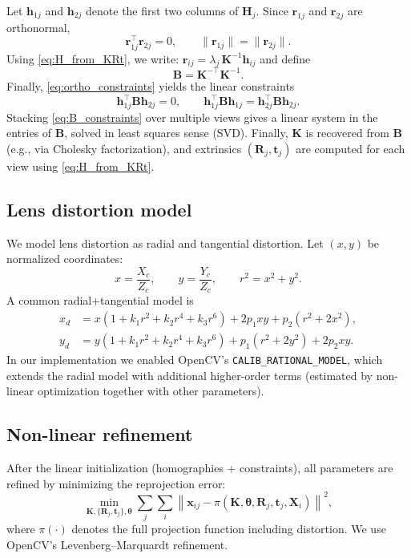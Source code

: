 \documentclass{article}
\begin{document}
Let $\mathbf{h}_{1j}$ and $\mathbf{h}_{2j}$ denote the first two columns of $\mathbf{H}_j$.
Since $\mathbf{r}_{1j}$ and $\mathbf{r}_{2j}$ are orthonormal,
\begin{equation}
\mathbf{r}_{1j}^{\top}\mathbf{r}_{2j}=0,
\qquad
\|\mathbf{r}_{1j}\|=\|\mathbf{r}_{2j}\|.
\label{eq:ortho_constraints}
\end{equation}
Using \eqref{eq:H_from_KRt}, we write:
$\mathbf{r}_{ij}=\lambda_j\,\mathbf{K}^{-1}\mathbf{h}_{ij}$ and define
\begin{equation}
\mathbf{B}=\mathbf{K}^{-\top}\mathbf{K}^{-1}.
\label{eq:B_def}
\end{equation}
Finally, \eqref{eq:ortho_constraints} yields the linear constraints
\begin{equation}
\mathbf{h}_{1j}^{\top}\mathbf{B}\mathbf{h}_{2j}=0,
\qquad
\mathbf{h}_{1j}^{\top}\mathbf{B}\mathbf{h}_{1j}=
\mathbf{h}_{2j}^{\top}\mathbf{B}\mathbf{h}_{2j}.
\label{eq:B_constraints}
\end{equation}
Stacking \eqref{eq:B_constraints} over multiple views gives a linear system in the entries of $\mathbf{B}$,
solved in least squares sense (SVD). Finally, $\mathbf{K}$ is recovered from $\mathbf{B}$ (e.g., via Cholesky factorization),
and extrinsics $(\mathbf{R}_j,\mathbf{t}_j)$ are computed for each view using \eqref{eq:H_from_KRt}.

\subsection{Lens distortion model}
We model lens distortion as radial and tangential distortion. Let $(x,y)$ be normalized coordinates:
\begin{equation}
x=\frac{X_c}{Z_c},\qquad y=\frac{Y_c}{Z_c},\qquad r^2=x^2+y^2.
\label{eq:normalized_coords}
\end{equation}
A common radial+tangential model is
\begin{align}
x_d &= x\left(1+k_1 r^2+k_2 r^4+k_3 r^6\right) + 2p_1xy + p_2(r^2+2x^2), \label{eq:dist_x}\\
y_d &= y\left(1+k_1 r^2+k_2 r^4+k_3 r^6\right) + p_1(r^2+2y^2) + 2p_2xy. \label{eq:dist_y}
\end{align}
In our implementation we enabled OpenCV's \texttt{CALIB\_RATIONAL\_MODEL}, which extends the radial model
with additional higher-order terms (estimated by non-linear optimization together with other parameters).

\subsection{Non-linear refinement}
After the linear initialization (homographies + constraints), all parameters are refined by minimizing the reprojection error:
\begin{equation}
\min_{\mathbf{K},\{\mathbf{R}_j,\mathbf{t}_j\},\boldsymbol{\theta}}
\sum_{j}\sum_{i}
\left\|
\mathbf{x}_{ij} - \pi(\mathbf{K},\boldsymbol{\theta},\mathbf{R}_j,\mathbf{t}_j,\mathbf{X}_i)
\right\|^2,
\label{eq:reproj_min}
\end{equation}
where $\pi(\cdot)$ denotes the full projection function including distortion. We use OpenCV's Levenberg--Marquardt refinement.
\end{document}

